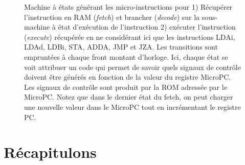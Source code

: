 \begin{figure}[htbp]
  \caption{\label{fig:transducteur_seq_branch} Machine à états générant les micro-instructions pour 1) Récupérer l'instruction en RAM (\emph{fetch}) et brancher (\emph{decode}) sur la sous-machine à état d'exécution de l'instruction 2) exécuter l'instruction (\emph{execute}) récupérée en ne considérant ici que les instructions LDAi, LDAd, LDBi, STA, ADDA, JMP et JZA. Les transitions sont empruntées à chaque front montant d'horloge. Ici, chaque état se voit attribuer un code qui permet de savoir quels signaux de contrôle doivent être générés en fonction de la valeur du registre MicroPC. Les signaux de contrôle sont produit par la ROM adressée par le MicroPC. Notez que dans le dernier état du fetch, on peut charger une nouvelle valeur dans le MicroPC tout en incrémentant le registre PC.}
\end{figure}



\newpage
\pagebreak
\section{Récapitulons}

